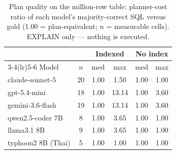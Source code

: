 \begin{table}[t]
\caption{Plan quality on the million-row table: planner-cost ratio of
each model's majority-correct SQL versus gold (1.00 = plan-equivalent;
$n$ = measurable cells). EXPLAIN only --- nothing is executed.}
\label{tab:plan}
\centering\small
\begin{tabular}{lccccc}
\toprule
 & & \multicolumn{2}{c}{Indexed} & \multicolumn{2}{c}{No index} \\
\cmidrule(lr){3-4}\cmidrule(lr){5-6}
Model & $n$ & med & max & med & max \\
\midrule
claude-sonnet-5 & 20 & 1.00 & 1.50 & 1.00 & 1.00 \\
gpt-5.4-mini & 18 & 1.00 & 13.14 & 1.00 & 3.60 \\
gemini-3.6-flash & 19 & 1.00 & 13.14 & 1.00 & 3.60 \\
qwen2.5-coder 7B & 8 & 1.00 & 3.65 & 1.00 & 1.00 \\
llama3.1 8B & 9 & 1.00 & 3.65 & 1.00 & 1.00 \\
typhoon2 8B (Thai) & 5 & 1.00 & 1.00 & 1.00 & 1.00 \\
\bottomrule
\end{tabular}
\end{table}
